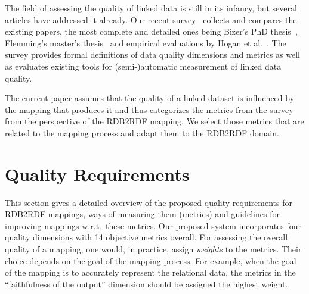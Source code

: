 The field of assessing the quality of linked data is still in its infancy, but several articles have addressed it already. 
Our recent survey~\cite{Zaveri} collects and compares the existing papers, 
the most complete and detailed ones being Bizer's PhD thesis~\cite{bizer2007quality}, Flemming's master's thesis~\cite{flemming} and empirical evaluations by Hogan et al.\ \cite{hogan2010weaving, hogan2012empirical}. 
The survey provides formal definitions of data quality dimensions and metrics as well as evaluates existing tools for (semi-)automatic measurement of linked data quality.

The current paper assumes that the quality of a linked dataset is influenced by the mapping that produces it and thus categorizes the metrics from the survey from the perspective of the RDB2RDF mapping.
We select those metrics that are related to the mapping process and adapt them to the RDB2RDF domain.


\section{Quality Requirements}
\label{requirements}

This section gives a detailed overview of the proposed quality requirements for RDB2RDF mappings, ways of measuring them (metrics) and guidelines for improving mappings w.r.t.\ these metrics.
Our proposed system incorporates four quality dimensions with 14 objective metrics overall.
For assessing the overall quality of a mapping, one would, in practice, assign \emph{weights} to the metrics.
Their choice depends on the goal of the mapping process.
For example, when the goal of the mapping is to accurately represent the relational data,
the metrics in the “faithfulness of the output” dimension should be assigned the highest weight.

